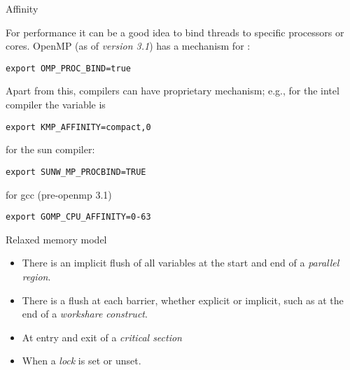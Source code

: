  {Affinity}

For performance it can be a good idea to bind threads to specific
processors or cores.  OpenMP (as of \emph{version 3.1}) has a
mechanism for :
\begin{verbatim}
export OMP_PROC_BIND=true  
\end{verbatim}
Apart from this, compilers can have proprietary mechanism; 
e.g., for the intel compiler the variable is
\begin{verbatim}
export KMP_AFFINITY=compact,0
\end{verbatim}
for the sun compiler:
\begin{verbatim}
export SUNW_MP_PROCBIND=TRUE
\end{verbatim}
for gcc (pre-openmp 3.1)
\begin{verbatim}
export GOMP_CPU_AFFINITY=0-63
\end{verbatim}

 {Relaxed memory model}


\begin{itemize}
\item There is an implicit flush of all variables at the start and end 
  of a \emph{parallel region}.
\item There is a flush at each barrier, whether explicit or implicit,
  such as at the end of a \emph{workshare construct}.
\item At entry and exit of a \emph{critical section}
\item When a \emph{lock} is set or unset.
\end{itemize}

